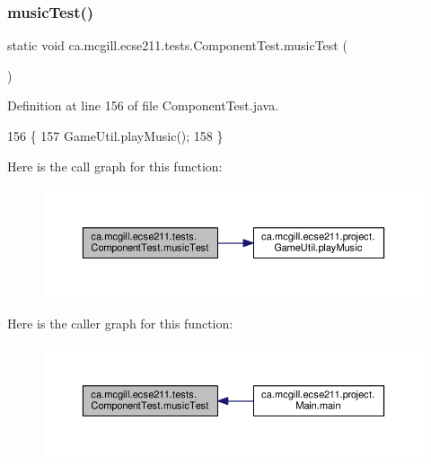 \subsubsection{\texorpdfstring{music\+Test()}{musicTest()}}
{\footnotesize\ttfamily static void ca.\+mcgill.\+ecse211.\+tests.\+Component\+Test.\+music\+Test (\begin{DoxyParamCaption}{ }\end{DoxyParamCaption})\hspace{0.3cm}{\ttfamily [static]}}



Definition at line 156 of file Component\+Test.\+java.


\begin{DoxyCode}
156                                  \{
157     GameUtil.playMusic();
158   \}
\end{DoxyCode}
Here is the call graph for this function\+:\nopagebreak
\begin{figure}[H]
\begin{center}
\leavevmode
\includegraphics[width=350pt]{enumca_1_1mcgill_1_1ecse211_1_1tests_1_1_component_test_a743c9bb90a8c8bc3fcf3b4c591990e7f_cgraph}
\end{center}
\end{figure}
Here is the caller graph for this function\+:\nopagebreak
\begin{figure}[H]
\begin{center}
\leavevmode
\includegraphics[width=350pt]{enumca_1_1mcgill_1_1ecse211_1_1tests_1_1_component_test_a743c9bb90a8c8bc3fcf3b4c591990e7f_icgraph}
\end{center}
\end{figure}
\mbox{\label{enumca_1_1mcgill_1_1ecse211_1_1tests_1_1_component_test_aa40592bb550b3526402faddbc0d890c7}} 
